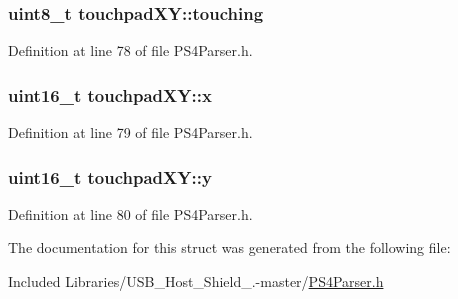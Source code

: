 \hypertarget{structtouchpad_x_y_a2c078e99c3b96303e6b6a60e2f36acc5}{
\subsubsection[{touching}]{\setlength{\rightskip}{0pt plus 5cm}uint8\-\_\-t {\bf touchpad\-X\-Y\-::touching}}}\label{structtouchpad_x_y_a2c078e99c3b96303e6b6a60e2f36acc5}


\-Definition at line 78 of file \-P\-S4\-Parser.\-h.

\hypertarget{structtouchpad_x_y_a1c38a3e4161b1495b4d8ce37124c72a5}{
\subsubsection[{x}]{\setlength{\rightskip}{0pt plus 5cm}uint16\-\_\-t {\bf touchpad\-X\-Y\-::x}}}\label{structtouchpad_x_y_a1c38a3e4161b1495b4d8ce37124c72a5}


\-Definition at line 79 of file \-P\-S4\-Parser.\-h.

\hypertarget{structtouchpad_x_y_ac4ceb26c0ebba1c5a2691a1ecdb7dbae}{
\subsubsection[{y}]{\setlength{\rightskip}{0pt plus 5cm}uint16\-\_\-t {\bf touchpad\-X\-Y\-::y}}}\label{structtouchpad_x_y_ac4ceb26c0ebba1c5a2691a1ecdb7dbae}


\-Definition at line 80 of file \-P\-S4\-Parser.\-h.



\-The documentation for this struct was generated from the following file\-:\begin{DoxyCompactItemize}
\item 
\-Included Libraries/\-U\-S\-B\-\_\-\-Host\-\_\-\-Shield\-\_.-\/master/\hyperlink{_p_s4_parser_8h}{\-P\-S4\-Parser.\-h}\end{DoxyCompactItemize}
